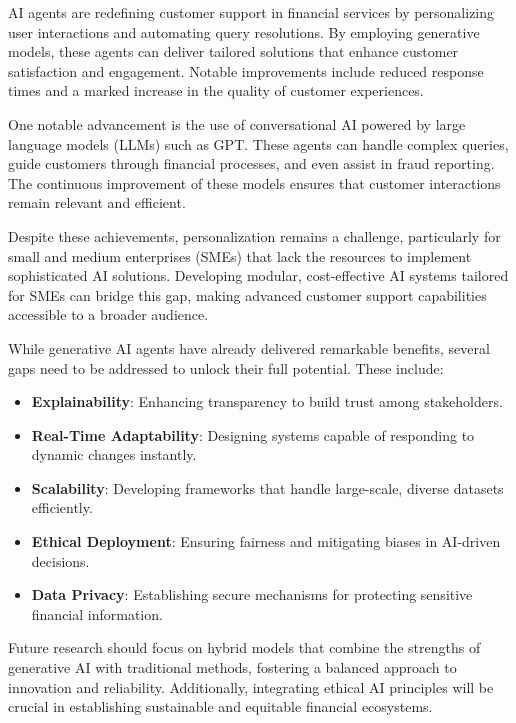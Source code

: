 \documentclass[a4paper,headinclude=on,footinclude=on,12pt,oneside]{scrbook}
\begin{document}
	
	AI agents are redefining customer support in financial services by personalizing user interactions and automating query resolutions. By employing generative models, these agents can deliver tailored solutions that enhance customer satisfaction and engagement. Notable improvements include reduced response times and a marked increase in the quality of customer experiences.
	
	One notable advancement is the use of conversational AI powered by large language models (LLMs) such as GPT. These agents can handle complex queries, guide customers through financial processes, and even assist in fraud reporting. The continuous improvement of these models ensures that customer interactions remain relevant and efficient.
	
	Despite these achievements, personalization remains a challenge, particularly for small and medium enterprises (SMEs) that lack the resources to implement sophisticated AI solutions. Developing modular, cost-effective AI systems tailored for SMEs can bridge this gap, making advanced customer support capabilities accessible to a broader audience.
	
	
	While generative AI agents have already delivered remarkable benefits, several gaps need to be addressed to unlock their full potential. These include:
	
	\begin{itemize}
		\item \textbf{Explainability}: Enhancing transparency to build trust among stakeholders.
		\item \textbf{Real-Time Adaptability}: Designing systems capable of responding to dynamic changes instantly.
		\item \textbf{Scalability}: Developing frameworks that handle large-scale, diverse datasets efficiently.
		\item \textbf{Ethical Deployment}: Ensuring fairness and mitigating biases in AI-driven decisions.
		\item \textbf{Data Privacy}: Establishing secure mechanisms for protecting sensitive financial information.
	\end{itemize}
	
	Future research should focus on hybrid models that combine the strengths of generative AI with traditional methods, fostering a balanced approach to innovation and reliability. Additionally, integrating ethical AI principles will be crucial in establishing sustainable and equitable financial ecosystems.
	
\end{document}
